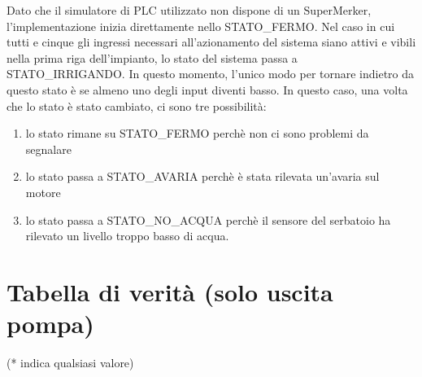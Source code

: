 \documentclass{article}
\begin{document}
    Dato che il simulatore di PLC utilizzato non dispone di un SuperMerker, l'implementazione inizia direttamente nello STATO\_FERMO. Nel caso in cui tutti e cinque gli ingressi necessari all'azionamento del sistema siano attivi e vibili nella prima riga dell'impianto, lo stato del sistema passa a STATO\_IRRIGANDO. In questo momento, l'unico modo per tornare indietro da questo stato è se almeno uno degli input diventi basso. In questo caso, una volta che lo stato è stato cambiato, ci sono tre possibilità:

    \begin{enumerate}
        \item lo stato rimane su STATO\_FERMO perchè non ci sono problemi da segnalare
        \item lo stato passa a STATO\_AVARIA perchè è stata rilevata un'avaria sul motore
        \item lo stato passa a STATO\_NO\_ACQUA perchè il sensore del serbatoio ha rilevato un livello troppo basso di acqua.
    \end{enumerate}

    \section{Tabella di verità (solo uscita pompa)}

    \begin{table}[H]
    \centering
    \end{table}

    (* indica qualsiasi valore)
\end{document}
